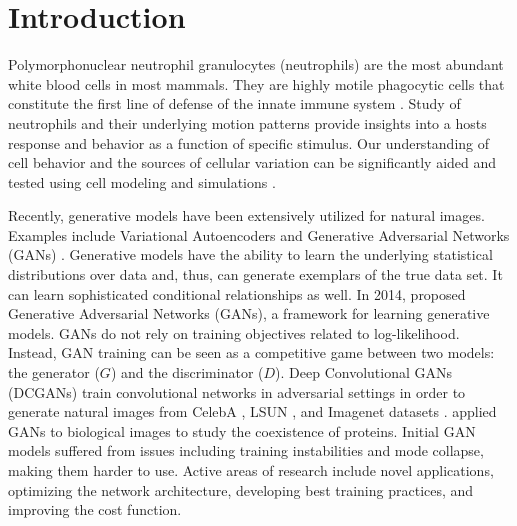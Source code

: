 \documentclass{article}
\newcommand{\squeezeup}{\vspace{-2.5mm}}
\begin{document}
\section{Introduction}
\label{sec:intro}
\squeezeup
\vspace{-2.0mm}
Polymorphonuclear neutrophil granulocytes (neutrophils) are the most abundant white blood cells in most mammals. They are highly motile phagocytic cells that constitute the first line of defense of the innate immune system \cite{howneutrophilskill}. Study of neutrophils and their underlying motion patterns provide insights into a host\textquotesingle s response and behavior as a function of specific stimulus. Our understanding of cell behavior and the sources of cellular variation can be significantly aided and tested using cell modeling and simulations \cite{punctuateproteinpattern}. \par
Recently, generative models have been extensively utilized for natural images. Examples include Variational Autoencoders \cite{journals/corr/KingmaW13} and Generative Adversarial Networks (GANs) \cite{NIPS2014_5423}. Generative models have the ability to learn the underlying statistical distributions over data and, thus, can generate exemplars of the true data set. It can learn sophisticated conditional relationships  as well. In 2014, \cite{NIPS2014_5423} proposed Generative Adversarial Networks (GANs), a framework for learning generative models. GANs do not rely on training objectives related to log-likelihood. Instead, GAN training can be seen as a competitive game between two models: the generator ($G$) and the discriminator ($D$). Deep Convolutional GANs (DCGANs) \cite{DBLP:journals/corr/RadfordMC15} train convolutional networks in adversarial settings in order to generate natural images from CelebA \cite{liu2015faceattributes}, LSUN \cite{DBLP:journals/corr/YuZSSX15}, and Imagenet datasets \cite{imagenet_cvpr09}. \cite{osokin2017biogans} applied GANs to biological images to study the coexistence of proteins. Initial GAN models suffered from issues including training instabilities and mode collapse, making them harder to use. Active areas of research include novel applications, optimizing the network architecture, developing best training practices, and improving the cost function. \par
\end{document}
